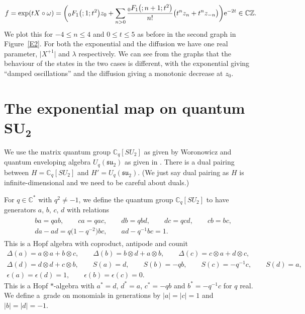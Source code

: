 \documentclass[10pt,a4paper]{amsart}
\numberwithin{equation}{section}
\newcommand{\tens}{\mathop{\otimes}}
\newcommand{\C}{\mathbb{C}}
\newcommand{\Z}{\mathbb{Z}}
\newcommand{\<}{\langle}
\renewcommand{\>}{\rangle}
\begin{document}
	\begin{gather*}
f=\exp(tX\circ \omega )=\bigg( {}_{0}F_{1}\big(;1;t^{2}\big)z_{0}+ \sum_{n > 0}\dfrac{{}_{0}F_{1} \big(;n+1;t^{2}\big)}{n!}\big( t^{n}z_{n }+t^{n}z_{-n }\big)\bigg){\rm e}^{-2t}\in \C \Z.
\end{gather*}
We plot this for $ -4\leq n\leq 4 $ and $ 0\leq t\leq 5$ as before in the second graph in Figure~\ref{E2}. For both the exponential and the diffusion we have one real parameter, $ \big|X^{+1}\big| $ and $ \lambda $ respectively. We can see from the graphs that the behaviour of the states in the two cases is different, with the exponential giving ``damped oscillations'' and the diffusion giving a monotonic decrease at $ z_{0} $.

\section[The exponential map on quantum SU\_2]{The exponential map on quantum $\boldsymbol{SU_{2}}$}

We use the matrix quantum group $ \C_{q}[SU_{2}] $ as given by Woronowicz \cite{WoroMatl} and quantum enveloping algebra $ U_{q}({\mathfrak{su}}_{2}) $ as given in \cite{PPKa, EKSk}. There is a dual pairing between $ H=\C_{q}[SU_{2}] $ and \mbox{$ H'=U_{q}({\mathfrak{su}}_{2}) $}. (We just say dual pairing as $ H $ is infinite-dimensional and we need to be careful about duals.)

\begin{Definition}
For $ q\in \mathbb{C}^{*} $ with $ q^{2}\neq -1 $, we define the quantum group $ \C_{q}[SU_{2}]$ to have generators $ a$, $b$, $c$, $d $ with relations
\begin{gather*}
\begin{split}
& b a=q a b, \qquad ca = q a c, \qquad d b=q b d,\qquad d c=q c d, \qquad c b=b c,\\
& d a - a d = q\big(1-q^{-2}\big)b c, \qquad a d-q^{-1}b c=1.
\end{split}
\end{gather*}
	This is a Hopf algebra with coproduct, antipode and counit
	\begin{gather*}
		\Delta(a)= a \tens a+b\tens c, \qquad 	\Delta(b)=b \tens d+a \tens b, \qquad 	\Delta(c)=c \tens a+d \tens c, \\
\Delta(d)=d\tens d+c\tens b,\qquad
		S(a)=d, \qquad 	S(b)=-qb, \qquad 	S(c)= -q^{-1}c, \qquad S(d)= a,\\
		\epsilon (a)=\epsilon (d)=1, \qquad \epsilon (b)=\epsilon (c)=0.
	\end{gather*}
		This is a Hopf $ * $-algebra with $a^{*} = d$, $d^{*} = a$, $c^{*}=-qb$ and $b^{*}=-q^{-1} c$ for $ q $ real. We define a~grade on monomials in generations by $ |a|=|c|=1$ and $|b|=|d|=-1$.
	\end{Definition}
\end{document}
